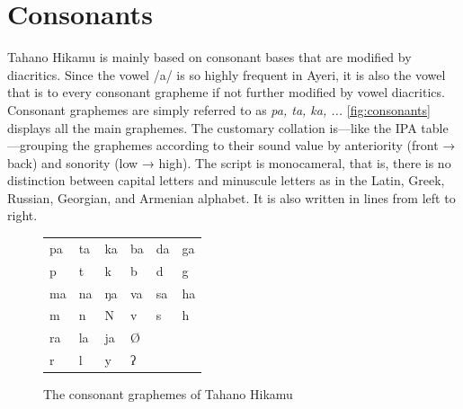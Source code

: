 \section{Consonants}

Tahano Hikamu is mainly based on consonant 
bases that are modified by diacritics. Since the vowel /a/ is so highly frequent 
in Ayeri, it is also the vowel that is  to every consonant grapheme 
if not further modified by vowel diacritics. Consonant graphemes are simply 
referred to as \textit{pa, ta, ka, ...} \autoref{fig:consonants} displays all 
the main graphemes. The customary collation is---like the IPA table---grouping 
the graphemes according to their sound value by anteriority (front → back) and 
sonority (low → high). The script is monocameral, that is, there is no 
distinction between capital letters and minuscule letters as in the Latin, 
Greek, Russian, Georgian, and Armenian alphabet. It is also written in lines 
from left to right.


\begin{figure}[ht]
\caption{The consonant graphemes of Tahano Hikamu}

\begin{tabu} to \linewidth{X[c] X[c] X[c] X[c] X[c] X[c]}
\toprule
\tableheaderfont	pa & ta & ka & ba & da & ga \\
\rowfont{\Tagati\huge}	p & t & k & b & d & g \\

\midrule

\tableheaderfont	ma & na & ŋa & va & sa & ha \\
\rowfont{\Tagati\huge}	m & n & N & v & s & h \\

\midrule

\tableheaderfont	ra & la & ja & Ø \\
\rowfont{\Tagati\huge}	r & l & y & ʔ \\

\bottomrule
\end{tabu}
\label{fig:thcons}
\end{figure}


